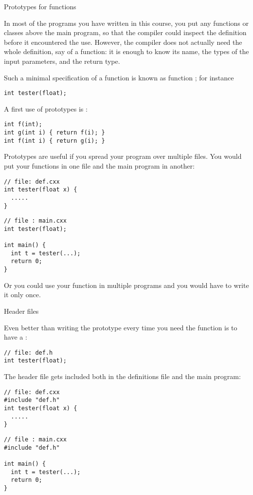 
 {Prototypes for functions}
\label{sec:proto}

In most of the programs you have written in this course, you put any
functions or classes above the main program, so that the compiler
could inspect the definition before it encountered the use. However,
the compiler does not actually need the whole definition, say of a
function: it is enough to know its name, the types of the input
parameters, and the return type.

Such a minimal specification of a function is known as function
; for instance
\begin{verbatim}
int tester(float);
\end{verbatim}

A first use of prototypes is :
\begin{verbatim}
int f(int);
int g(int i) { return f(i); }
int f(int i) { return g(i); }
\end{verbatim}

Prototypes are useful if you spread your program over multiple
files. You would put your functions in one file
and the main program in another:
\begin{multicols}{2}  
\begin{verbatim}
// file: def.cxx
int tester(float x) {
  .....
}
\end{verbatim}
\vfill\columnbreak
\begin{verbatim}
// file : main.cxx
int tester(float);

int main() {
  int t = tester(...);
  return 0;
}
\end{verbatim}
\end{multicols}

Or you could use your function in multiple programs and you would have to
write it only once.

 {Header files}
\label{sec:hfile}

Even better than writing the prototype every time you need the
function is to have a :
\begin{verbatim}
// file: def.h
int tester(float);
\end{verbatim}
The header file gets included both in the definitions file and the
main program:
\begin{multicols}{2}  
\begin{verbatim}
// file: def.cxx
#include "def.h"
int tester(float x) {
  .....
}
\end{verbatim}
\vfill\columnbreak
\begin{verbatim}
// file : main.cxx
#include "def.h"

int main() {
  int t = tester(...);
  return 0;
}
\end{verbatim}
\end{multicols}

